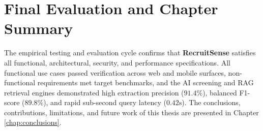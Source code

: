 \section{Final Evaluation and Chapter Summary}
The empirical testing and evaluation cycle confirms that \textbf{RecruitSense} satisfies all functional, architectural, security, and performance specifications. All functional use cases passed verification across web and mobile surfaces, non-functional requirements met target benchmarks, and the AI screening and RAG retrieval engines demonstrated high extraction precision ($91.4\%$), balanced F1-score ($89.8\%$), and rapid sub-second query latency ($0.42\text{s}$). The conclusions, contributions, limitations, and future work of this thesis are presented in Chapter \ref{chap:conclusions}.

